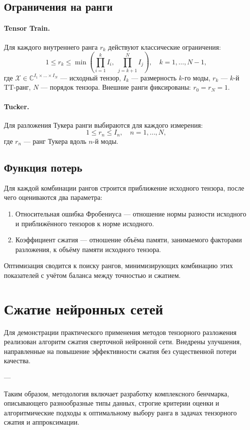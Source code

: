 \subsection*{Ограничения на ранги}

\paragraph{Tensor Train.} Для каждого внутреннего ранга \(r_k\) действуют классические ограничения:
\[
1 \le r_k \le \min\left(\prod_{i=1}^k I_i,\; \prod_{j=k+1}^N I_j\right), \quad k=1,\dots,N-1,
\]
где \(\mathcal{X} \in \mathbb{C}^{I_1 \times \dots \times I_N}\) — исходный тензор, \(I_k\) — размерность \(k\)-го моды, \(r_k\) — \(k\)-й TT-ранг, \(N\) — порядок тензора. Внешние ранги фиксированы: \(r_0 = r_N = 1\).

\paragraph{Tucker.} Для разложения Тукера ранги выбираются для каждого измерения:
\[
1 \le r_n \le I_n, \quad n=1,\dots,N,
\]
где \(r_n\) — ранг Тукера вдоль \(n\)-й моды.

\subsection*{Функция потерь}

Для каждой комбинации рангов строится приближение исходного тензора, после чего оцениваются два параметра:

\begin{enumerate}
    \item Относительная ошибка Фробениуса — отношение нормы разности исходного и приближённого тензоров к норме исходного.
    \item Коэффициент сжатия — отношение объёма памяти, занимаемого факторами разложения, к объёму памяти исходного тензора.
\end{enumerate}

Оптимизация сводится к поиску рангов, минимизирующих комбинацию этих показателей с учётом баланса между точностью и сжатием.

\section{Сжатие нейронных сетей}

Для демонстрации практического применения методов тензорного разложения реализован алгоритм сжатия сверточной нейронной сети. Внедрены улучшения, направленные на повышение эффективности сжатия без существенной потери качества.

---

Таким образом, методология включает разработку комплексного бенчмарка, описывающего разнообразные типы данных, строгие критерии оценки и алгоритмические подходы к оптимальному выбору ранга в задачах тензорного сжатия и аппроксимации.
